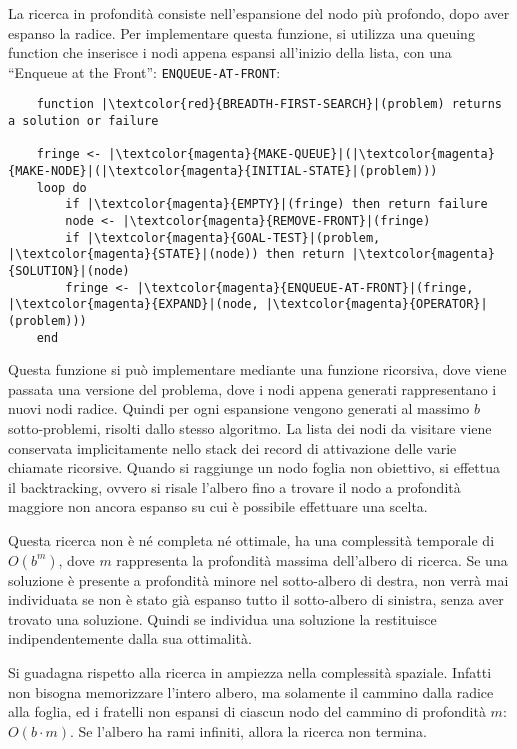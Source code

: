 \documentclass{article}
\numberwithin{equation}{subsection}
\begin{document}
La ricerca in profondità consiste nell'espansione del nodo più profondo, dopo aver espanso 
la radice. 
Per implementare questa funzione, si utilizza una queuing function che inserisce i nodi 
appena espansi all'inizio della lista, con una ``Enqueue at the Front'': \color{magenta}\verb|ENQUEUE-AT-FRONT|\color{black}:

\begin{verbatim}
    function |\textcolor{red}{BREADTH-FIRST-SEARCH}|(problem) returns a solution or failure
    
    fringe <- |\textcolor{magenta}{MAKE-QUEUE}|(|\textcolor{magenta}{MAKE-NODE}|(|\textcolor{magenta}{INITIAL-STATE}|(problem)))
    loop do
        if |\textcolor{magenta}{EMPTY}|(fringe) then return failure
        node <- |\textcolor{magenta}{REMOVE-FRONT}|(fringe)
        if |\textcolor{magenta}{GOAL-TEST}|(problem, |\textcolor{magenta}{STATE}|(node)) then return |\textcolor{magenta}{SOLUTION}|(node)
        fringe <- |\textcolor{magenta}{ENQUEUE-AT-FRONT}|(fringe, |\textcolor{magenta}{EXPAND}|(node, |\textcolor{magenta}{OPERATOR}|(problem)))
    end
\end{verbatim}

Questa funzione si può implementare mediante una funzione ricorsiva, dove viene 
passata una versione del problema, dove i nodi appena generati rappresentano i nuovi 
nodi radice. Quindi per ogni espansione vengono generati al massimo $b$ sotto-problemi, risolti 
dallo stesso algoritmo. La lista dei nodi da visitare viene conservata implicitamente nello 
stack dei record di attivazione delle varie chiamate ricorsive. Quando si raggiunge un nodo 
foglia non obiettivo, si effettua il backtracking, ovvero si risale l'albero fino a trovare il 
nodo a profondità maggiore non ancora espanso su cui è possibile effettuare una scelta. 

Questa ricerca non è né completa né ottimale, ha una complessità temporale di $O(b^m)$, dove 
$m$ rappresenta la profondità massima dell'albero di ricerca. Se una soluzione è presente a 
profondità minore nel sotto-albero di destra, non verrà mai individuata se non è stato già 
espanso tutto il sotto-albero di sinistra, senza aver trovato una soluzione. Quindi se individua 
una soluzione la restituisce indipendentemente dalla sua ottimalità. 

Si guadagna rispetto alla ricerca in ampiezza nella complessità spaziale. Infatti non bisogna 
memorizzare l'intero albero, ma solamente il cammino dalla radice alla foglia, ed i 
fratelli non espansi di ciascun nodo del cammino di profondità $m$: $O(b\cdot m)$. Se 
l'albero ha rami infiniti, allora la ricerca non termina. 
\end{document}
